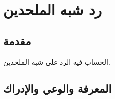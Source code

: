\chapter{رد شبه الملحدين}


\section{مقدمة}

الحساب فيه الرد على شبه الملحدين.



\section{المعرفة والوعي والإدراك}
